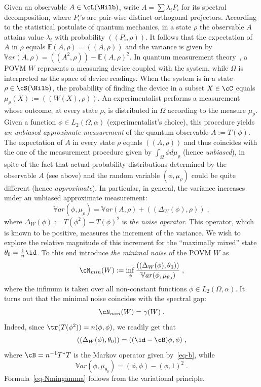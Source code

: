 Given an observable $A \in \cL(\Hilb)$, write $A= \sum \lambda_iP_i$ for its spectral decomposition, where $P_i$'s are pair-wise distinct orthogonal projectors. According to the statistical postulate of quantum mechanics, in a state $\rho$ the observable $A$ attains value $\lambda_i$ with probability $((P_i,\rho))$. It follows that the expectation of $A$ in $\rho$ equals $\mathbb{E}(A,\rho)= ((A,\rho))$ and the variance is given by $\mathbb{V}ar(A,\rho) = ((A^2,\rho)) - \mathbb{E}(A,\rho)^2$. In quantum measurement theory~\cite{Busch-2}, a POVM $W$ represents a measuring device coupled with the system, while $\Omega$ is interpreted as the space of device readings. When the system is in a state $\rho \in \cS(\Hilb)$, the probability of finding the device in a subset $X \in \cC$ equals $\mu_{\rho}(X):= ((W(X),\rho))$. An experimentalist performs a measurement whose outcome, at every state $\rho$, is distributed in $\Omega$ according to the measure $\mu_{\rho}$. Given a function $\phi \in L_2(\Omega,\alpha)$ (experimentalist's choice), this procedure yields \emph{an unbiased approximate measurement} of the quantum observable $A:=T(\phi)$. The expectation of $A$ in every state $\rho$ equals $((A,\rho))$ and thus coincides with the one of the measurement procedure given by $\int_\Omega \phi d\mu_\rho$ (hence \emph{unbiased}), in spite of the fact that actual probability distributions determined by the observable $A$ (see above) and the random variable $(\phi,\mu_{\rho})$ could be quite different (hence \emph{approximate}). In particular, in general, the variance increases under an unbiased approximate measurement:
\begin{equation}\label{eq-noise}
\mathbb{V}ar(\phi,\mu_{\rho}) = \mathbb{V}ar(A,\rho) + ((\Delta_W(\phi),\rho))\;,
\end{equation}
where $\Delta_W(\phi):= T(\phi^2)-T(\phi)^2 $ is \emph{the noise operator}. This operator, which is known to be positive, measures the increment of the variance. We wish to explore the relative magnitude of this increment for the ``maximally mixed'' state
$\theta_0= \frac{1}{n}\id$. To this end introduce \emph{the minimal noise} of the POVM $W$ as
\[
\cN_{min}(W):= \inf_{\phi} \frac{((\Delta_W(\phi),\theta_0))}{\mathbb{V}ar(\phi,\mu_{\theta_0}) }\;,
\]
where the infimum is taken over all non-constant functions $\phi \in L_2(\Omega,\alpha)$. It turns out that the minimal noise coincides with the spectral gap:
\begin{equation}\label{eq-Nmingamma}
\cN_{min}(W) = \gamma(W)\;.
\end{equation}
Indeed, since $\tr(T(\phi^2))= n(\phi,\phi)$, we readily get that
\[
((\Delta_W(\phi),\theta_0))= ((\id- \cB)\phi,\phi)\;,
\]
where $\cB= n^{-1}T^*T$ is the Markov operator given by~\eqref{eq-b},
while
\[
\mathbb{V}ar(\phi,\mu_{\theta_0})= (\phi,\phi) - (\phi,1)^2\;.
\]
Formula~\eqref{eq-Nmingamma} follows from the variational principle.

